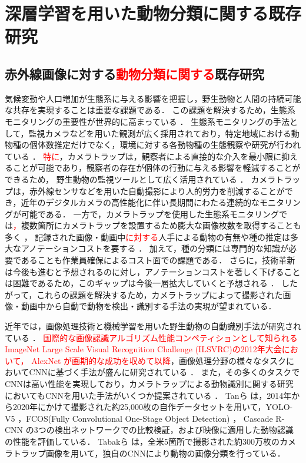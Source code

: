 \documentclass[a4paper,11pt,nomag]{jsreport}
\begin{document}
\setcounter{chapter}{2}

\chapter*{深層学習を用いた動物分類に関する既存研究}

\section{赤外線画像に対する\textcolor{red}{動物分類に関する}既存研究}

気候変動や人口増加が生態系に与える影響を把握し，野生動物と人間の持続可能な共存を実現することは重要な課題である．
この課題を解決するため，生態系モニタリングの重要性が世界的に高まっている \cite{zwerts2021, bandaru2024}．
生態系モニタリングの手法として，監視カメラなどを用いた観測が広く採用されており，特定地域における動物種の個体数推定だけでなく，環境に対する各動物種の生態観察や研究が行われている \cite{trolliet2014}．
\textcolor{red}{特に}，カメラトラップは，観察者による直接的な介入を最小限に抑えることが可能であり，観察者の存在が個体の行動に与える影響を軽減することができるため，
野生動物の監視ツールとして広く活用されている \cite{本郷2018, abood2023}．
カメラトラップは，赤外線センサなどを用いた自動撮影により人的労力を削減することができ，近年のデジタルカメラの高性能化に伴い長期間にわたる連続的なモニタリングが可能である．
一方で，カメラトラップを使用した生態系モニタリングでは\textcolor{red}{，}複数箇所にカメラトラップを設置するため膨大な画像枚数を取得することも多く \cite{kays2020, si2014}，
記録された画像・動画中\textcolor{red}{に対する}人手による動物の有無や種の推定は多大なアノテーションコストを要する \cite{thangaraj2023}．
加えて，種の分類には専門的な知識が必要であることも作業員確保によるコスト面での課題である．
さらに，技術革新は今後も進むと予想されるのに対し，アノテーションコストを著しく下げることは困難であるため，このギャップは今後一層拡大していくと予想される \cite{安藤2019}．
したがって，これらの課題を解決するため，カメラトラップによって撮影された画像・動画中から自動で動物を検出・識別する手法の実現が望まれている．

近年では，画像処理技術と機械学習を用いた野生動物の自動識別手法が研究されている \textcolor{red}{\cite{manna2023, mohanty2022}}．
\textcolor{red}{国際的な画像認識アルゴリズム性能コンペティションとして知られるImageNet Large Scale Visual Recognition Challenge (ILSVRC)の2012年大会において，
AlexNet \cite{alexnet}が画期的な成功を収めて以降}，画像処理分野の様々なタスクにおいてCNNに基づく手法が盛んに研究されている \textcolor{red}{\cite{mohanty2016, sue2020}}．
また，その多くのタスクでCNNは高い性能を実現しており，カメラトラップによる動物識別に関する研究においてもCNNを用いた手法がいくつか提案されている \textcolor{red}{\cite{agarwal2023, neeli2023, thangaraj2023, abood2023}}．
Tanら \cite{tan2022}は，2014年から2020年にかけて撮影された約25,000枚の自作データセットを用いて，YOLO-V5 \cite{yolov5}，FCOS(Fully Convolutional One-Stage Object Detection) \cite{fcos}，
Cascade R-CNN \cite{cascade}の3つの検出ネットワークでの比較検証，および映像に適用した動物認識の性能を評価している．
Tabakら \cite{tabak2019}は，全米5箇所で撮影された約300万枚のカメラトラップ画像を用いて，独自のCNNにより動物の画像分類を行っている．
\end{document}
